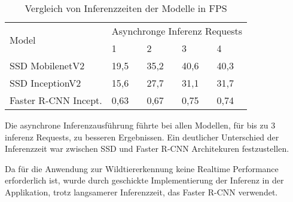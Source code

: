 \vspace{1cm}
\begin{table}[htb]
  \centering
  \begin{tabular}{m{}|m{}<{\centering}|m{}<{\centering}|m{}<{\centering}|m{}<{\centering}}
  \hline
  \multirow{2}{*}{Model} & \multicolumn{4}{c}{Asynchronge Inferenz Requests} \\ \cline{2-5} 
                         & 1           & 2          & 3          & 4          \\ \hline\hline
  SSD MobilenetV2        & 19,5           & 35,2          & 40,6          & 40,3          \\
  SSD InceptionV2        & 15,6           & 27,7          & 31,1          & 31,7          \\
  Faster R-CNN Incept.   & 0,63           & 0,67          & 0,75          & 0,74          \\ \hline
  \end{tabular}
  \caption{Vergleich von Inferenzzeiten der Modelle in FPS}
  \label{table:infertime}
\end{table}
\vspace{1cm}

Die asynchrone Inferenzausführung führte bei allen Modellen, 
für bis zu 3 inferenz Requests, zu besseren Ergebnissen.
Ein deutlicher Unterschied der Inferenzzeit war 
zwischen SSD und Faster R-CNN Architekuren festzustellen.

Da für die Anwendung zur Wildtiererkennung 
keine Realtime Performance erforderlich ist,
wurde durch geschickte Implementierung der Inferenz in der 
Applikation, trotz langsamerer Inferenzzeit, das 
Faster R-CNN verwendet.
